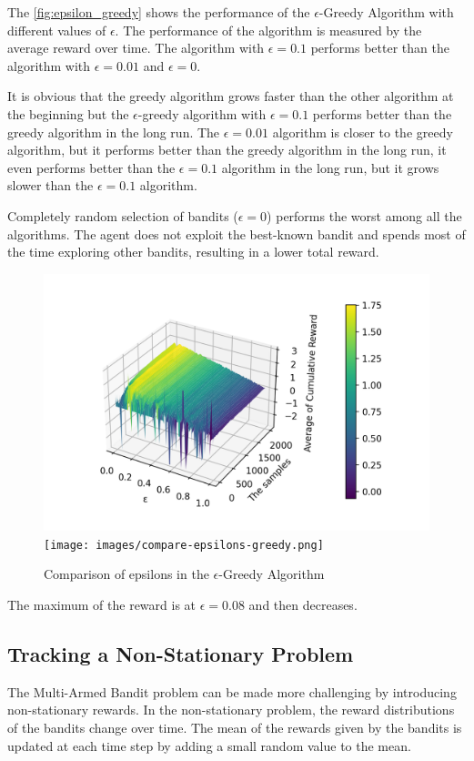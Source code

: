 The \ref{fig:epsilon_greedy} shows the performance of the $\epsilon$-Greedy Algorithm with different values of $\epsilon$. The performance of the algorithm is measured by the average reward over time. The algorithm with $\epsilon=0.1$ performs better than the algorithm with $\epsilon=0.01$ and $\epsilon=0$.

It is obvious that the greedy algorithm grows faster than the other algorithm at the beginning but the $\epsilon$-greedy algorithm with $\epsilon=0.1$ performs better than the greedy algorithm in the long run. The $\epsilon=0.01$ algorithm is closer to the greedy algorithm, but it performs better than the greedy algorithm in the long run, it even performs better than the $\epsilon=0.1$ algorithm in the long run, but it grows slower than the $\epsilon=0.1$ algorithm.

Completely random selection of bandits ($\epsilon=0$) performs the worst among all the algorithms. The agent does not exploit the best-known bandit and spends most of the time exploring other bandits, resulting in a lower total reward.

\begin{figure}[h!]
    \centering
    \includegraphics[width=0.49\linewidth]{images/3d-compare-epsilon-greedy.png}
    \texttt{[image: images/compare-epsilons-greedy.png]}
    \caption{Comparison of epsilons in the $\epsilon$-Greedy Algorithm}
    \label{fig:epsilon_greedy_optimistic}
\end{figure}

The maximum of the reward is at $\epsilon=0.08$ and then decreases.

\subsection{Tracking a Non-Stationary Problem}

The Multi-Armed Bandit problem can be made more challenging by introducing non-stationary rewards. In the non-stationary problem, the reward distributions of the bandits change over time. The mean of the rewards given by the bandits is updated at each time step by adding a small random value to the mean.

